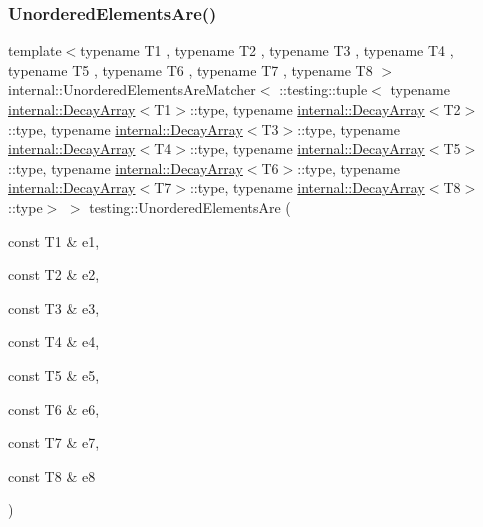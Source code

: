 \subsubsection{\texorpdfstring{UnorderedElementsAre()}{UnorderedElementsAre()}\hspace{0.1cm}{\footnotesize\ttfamily [9/11]}}
{\footnotesize\ttfamily template$<$typename T1 , typename T2 , typename T3 , typename T4 , typename T5 , typename T6 , typename T7 , typename T8 $>$ \\
internal\+::\+Unordered\+Elements\+Are\+Matcher$<$ \+::testing\+::tuple$<$ typename \mbox{\hyperlink{structtesting_1_1internal_1_1_decay_array}{internal\+::\+Decay\+Array}}$<$T1$>$\+::type, typename \mbox{\hyperlink{structtesting_1_1internal_1_1_decay_array}{internal\+::\+Decay\+Array}}$<$T2$>$\+::type, typename \mbox{\hyperlink{structtesting_1_1internal_1_1_decay_array}{internal\+::\+Decay\+Array}}$<$T3$>$\+::type, typename \mbox{\hyperlink{structtesting_1_1internal_1_1_decay_array}{internal\+::\+Decay\+Array}}$<$T4$>$\+::type, typename \mbox{\hyperlink{structtesting_1_1internal_1_1_decay_array}{internal\+::\+Decay\+Array}}$<$T5$>$\+::type, typename \mbox{\hyperlink{structtesting_1_1internal_1_1_decay_array}{internal\+::\+Decay\+Array}}$<$T6$>$\+::type, typename \mbox{\hyperlink{structtesting_1_1internal_1_1_decay_array}{internal\+::\+Decay\+Array}}$<$T7$>$\+::type, typename \mbox{\hyperlink{structtesting_1_1internal_1_1_decay_array}{internal\+::\+Decay\+Array}}$<$T8$>$\+::type$>$ $>$ testing\+::\+Unordered\+Elements\+Are (\begin{DoxyParamCaption}\item[{const T1 \&}]{e1,  }\item[{const T2 \&}]{e2,  }\item[{const T3 \&}]{e3,  }\item[{const T4 \&}]{e4,  }\item[{const T5 \&}]{e5,  }\item[{const T6 \&}]{e6,  }\item[{const T7 \&}]{e7,  }\item[{const T8 \&}]{e8 }\end{DoxyParamCaption})\hspace{0.3cm}{\ttfamily [inline]}}

\mbox{\label{namespacetesting_a2e03e363e193ef512bf9fa964c484375}} 
